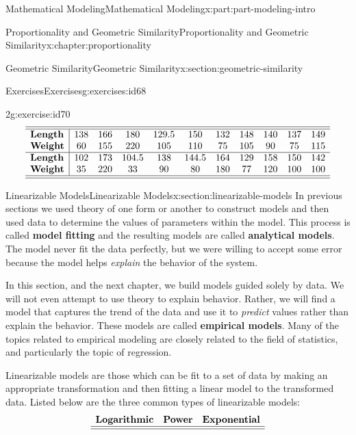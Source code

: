 \documentclass[oneside,10pt,]{book}
\newcommand{\terminology}[1]{\textbf{#1}}
\numberwithin{equation}{section}
\begin{document}
\begin{partptx}{Mathematical Modeling}{}{Mathematical Modeling}{}{}{x:part:part-modeling-intro}
\begin{chapterptx}{Proportionality and Geometric Similarity}{}{Proportionality and Geometric Similarity}{}{}{x:chapter:proportionality}
\begin{sectionptx}{Geometric Similarity}{}{Geometric Similarity}{}{}{x:section:geometric-similarity}
\begin{exercises-subsection-numberless}{Exercises}{}{Exercises}{}{}{g:exercises:id68}
\begin{divisionexercise}{2}{}{}{g:exercise:id70}
%
\begin{equation*}
\begin{array}{l|cccccccccc}\hline\hline
\textbf{Length}& 138 & 166 & 180 & 129.5 & 150 & 132 & 148 & 140 & 137 & 149 \\
\textbf{Weight}& 60 & 155 & 220 & 105 & 110 & 75 & 105 & 90 & 75 & 115 \\\hline
\textbf{Length}& 102 & 173 & 104.5 & 138 & 144.5 & 164 & 129 & 158 & 150 & 142 \\
\textbf{Weight}& 35 & 220 & 33 & 90 & 80 & 180 & 77 & 120 & 100 & 100 \\\hline\hline
\end{array}
\end{equation*}
\end{divisionexercise}%
\end{exercises-subsection-numberless}
\end{sectionptx}
%
%
\typeout{************************************************}
\typeout{************************************************}
%
\begin{sectionptx}{Linearizable Models}{}{Linearizable Models}{}{}{x:section:linearizable-models}
In previous sections we used theory of one form or another to construct models and then used data to determine the values of parameters within the model. This process is called \terminology{model fitting} and the resulting models are called \terminology{analytical models}. The model never fit the data perfectly, but we were willing to accept some error because the model helps \emph{explain} the behavior of the system.%
\par
In this section, and the next chapter, we build models guided solely by data. We will not even attempt to use theory to explain behavior. Rather, we will find a model that captures the trend of the data and use it to \emph{predict} values rather than explain the behavior. These models are called \terminology{empirical models}. Many of the topics related to empirical modeling are closely related to the field of statistics, and particularly the topic of regression.%
\par
Linearizable models are those which can be fit to a set of data by making an appropriate transformation and then fitting a linear model to the transformed data. Listed below are the three common types of linearizable models:%
%
\begin{equation*}
\begin{array}{ccc}
\textbf{Logarithmic} & \textbf{Power} & \textbf{Exponential} \\\hline\hline

\end{array}
\end{equation*}
\end{sectionptx}
\end{chapterptx}
\end{partptx}
\end{document}
